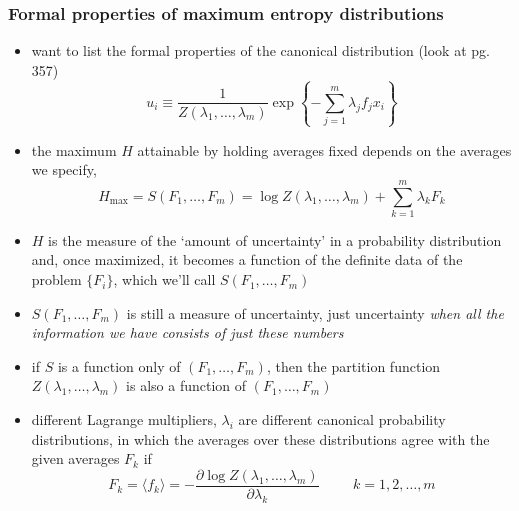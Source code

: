 \documentclass[../jaynes_prob_theory_notes.tex]{subfiles}
\begin{document}
            \subsubsection{Formal properties of maximum entropy distributions}
                \begin{itemize} 
                    \item want to list the formal properties of the canonical distribution (look at pg. 357)
                        \begin{equation} 
                            \label{canon_dist}
                            u_i \equiv \frac{1}{Z({\lambda}_1, \ldots, {\lambda}_m)} \exp \left \{ - \sum\limits^{m}_{j=1} {\lambda}_j f_j {x_i} \right \}
                        \end{equation}
                    \item the maximum \( H \) attainable by holding averages fixed depends on the averages we specify,
                        \begin{equation*} 
                            H_{\max} = S(F_1, \ldots, F_m) = \log Z({\lambda}_1, \ldots, {\lambda}_m) + \sum\limits^{m}_{k=1} {\lambda}_k F_k
                        \end{equation*}
                    \item \( H \) is the measure of the `amount of uncertainty' in a probability  distribution and, once maximized, it becomes a function of the definite data of the problem \( \{ F_i \} \), which we'll call \( S(F_1, \ldots, F_m) \) 
                    \item \( S(F_1, \ldots, F_m) \) is still a measure of uncertainty, just uncertainty \textit{when all the information we have consists of just these numbers}
                    \item if \( S \) is a function only of \( (F_1, \ldots, F_m) \), then the partition function \( Z({\lambda}_1, \ldots, {\lambda}_m) \) is also a function of \( (F_1, \ldots, F_m) \)
                    \item different Lagrange multipliers, \( {\lambda}_i \) are different canonical probability distributions, in which the averages over these distributions agree with the given averages \(F_k\) if 
                        \begin{equation*} 
                            F_k = \langle f_k \rangle = - \frac{\partial \log Z({\lambda}_1, \ldots, {\lambda}_m)}{\partial {\lambda}_k} \hspace{1cm} k = 1, 2, \ldots, m
                        \end{equation*}

\end{itemize}
\end{document}
